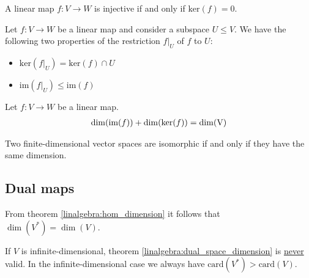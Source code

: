     \begin{property}
            A linear map $f:V\rightarrow W$ is injective if and only if $\text{ker}(f) = 0$.
    \end{property}
    \begin{property}
            Let $f:V\rightarrow W$ be a linear map and consider a subspace $U\leq V$. We have the following two properties of the restriction $f|_U$ of $f$ to $U$:
            \begin{itemize}
            \item $\text{ker}\left(f|_U\right) = \text{ker}(f)\cap U$
                \item $\text{im}\left(f|_U\right) \leq \text{im}(f)$
        \end{itemize}
    \end{property}

        \begin{theorem}
        Let $f: V \rightarrow W$ be a linear map.
            \begin{gather}
                    \label{linalgebra:dimension_theorem}
                    \dim(\text{\upshape im}(f)) + \dim(\text{\upshape ker}(f)) = \dim(\text{\upshape V})
            \end{gather}
        \end{theorem}
        \begin{result}
        Two finite-dimensional vector spaces are isomorphic if and only if they have the same dimension.
    \end{result}

\subsection{Dual maps}

    \begin{property}\label{linalgebra:dual_space_dimension}
        From theorem \ref{linalgebra:hom_dimension} it follows that $\dim(V^*) = \dim(V)$.
    \end{property}
    \begin{remark}
        If $V$ is infinite-dimensional, theorem \ref{linalgebra:dual_space_dimension} is \underline{never} valid. In the infinite-dimensional case we always have $\text{card}(V^*)>\text{card}(V)$.
    \end{remark}

